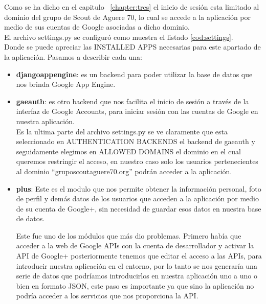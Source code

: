 Como se ha dicho en el capitulo ~\ref{chapter:tres} el inicio de sesión esta limitado al dominio del grupo de Scout de Aguere 70, lo cual se accede a la aplicación
por medio de sus cuentas de Google asociadas a dicho dominio.\\

El archivo settings.py se configuró como muestra el listado \ref{cod:settings}.\\



Donde se puede apreciar las \textsc{INSTALLED APPS} necesarias para este apartado de la aplicación. Pasamos a describir cada una:\\
\begin{itemize}
\item \textbf{djangoappengine}: es un backend para poder utilizar la base de datos que nos brinda Google App Engine.\\

\item \textbf{gaeauth}: es otro backend que nos facilita el inicio de sesión a través de la interfaz de Google Accounts, 
para iniciar sesión con las cuentas de Google en nuestra aplicación.\\

Es la ultima parte del archivo settings.py se ve claramente que esta seleccionado en \textsc{AUTHENTICATION BACKENDS} el backend de gaeauth y seguidamente elegimos en \textsc{ALLOWED DOMAINS} el dominio
en el cual queremos restringir el acceso, en nuestro caso solo los usuarios pertenecientes al dominio ``gruposcoutaguere70.org'' podrán acceder a la aplicación.

\item \textbf{plus}: Este es el modulo que nos permite obtener la información personal, foto de perfil y demás datos de los usuarios que acceden a la aplicación por medio de su cuenta de Google+, sin necesidad
de guardar esos datos en nuestra base de datos.

Este fue uno de los módulos que más dio problemas. Primero había que acceder a la web de Google APIs con la cuenta de desarrollador y activar la API de Google+ posteriormente tenemos que editar el acceso a las APIs,
para introducir nuestra aplicación en el entorno, por lo tanto se nos generaría una serie de datos que podríamos introducirlos en nuestra aplicación uno a uno o bien en formato JSON, este paso es importante ya que sino la aplicación
no podría acceder a los servicios que nos proporciona la API.\\

\end{itemize}

